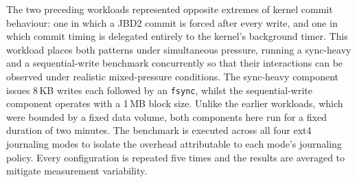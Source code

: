 \documentclass[12pt,a4paper]{article}
\begin{document}
The two preceding workloads represented opposite extremes of kernel commit behaviour:
one in which a JBD2 commit is forced after every write, and one in which commit timing
is delegated entirely to the kernel's background timer. This workload places both
patterns under simultaneous pressure, running a sync-heavy and a sequential-write
benchmark concurrently so that their interactions can be observed under realistic
mixed-pressure conditions. The sync-heavy component issues 8\,KB writes each followed
by an \texttt{fsync}, whilst the sequential-write component operates with a 1\,MB
block size. Unlike the earlier workloads, which were bounded by a fixed data volume,
both components here run for a fixed duration of two minutes. The benchmark is executed
across all four ext4 journaling modes to isolate the overhead attributable to each
mode's journaling policy. Every configuration is repeated five times and the results
are averaged to mitigate measurement variability.

\begin{table}[H]
\centering
\caption{Combined Throughput and Average Latency for WAL and Sequential Workloads}
\label{tab:combined}
\renewcommand{\arraystretch}{1.1}
\small
{}
\end{table}
\end{document}
